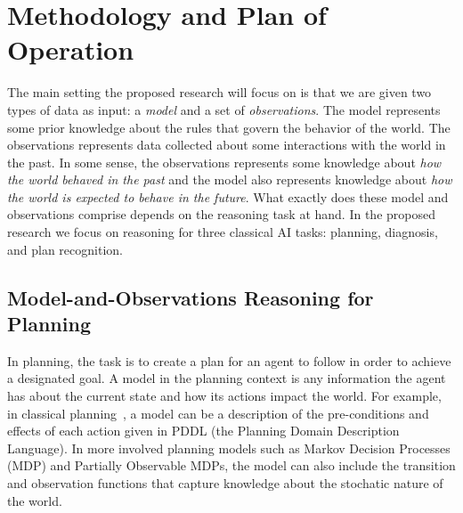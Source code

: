 \documentclass[12pt]{article}
\begin{document}
\section{Methodology and Plan of Operation}
\label{sec:methodology}


The main setting the proposed research will focus on is that we are given two types of data as input: 
a {\em model} and a set of {\em observations}. The model represents some prior knowledge about the rules that govern the behavior of the world. The observations represents data collected about some  interactions with the world in the past. 
In some sense, the observations represents some knowledge about {\em how the world behaved in the past} and the model also represents knowledge about {\em how the world is expected to behave in the future}. What exactly does these model and observations comprise depends on the reasoning task at hand. In the proposed research we focus on reasoning for three classical AI tasks: planning, diagnosis, and plan recognition. %



\subsection{Model-and-Observations Reasoning for Planning}


In planning, the task is to create a plan for an agent to follow in order to achieve a designated goal. A model in the planning context is any information the agent has about the current state and how its actions impact the world. %
For example, in classical planning~\cite{fikes1971strips}, a model can be a description of the pre-conditions and effects of each action given in PDDL (the Planning Domain Description Language). In more involved planning models such as Markov Decision Processes (MDP) and Partially Observable MDPs, the model can also include the transition and observation functions that capture knowledge about the stochatic nature of the world. 
\end{document}
